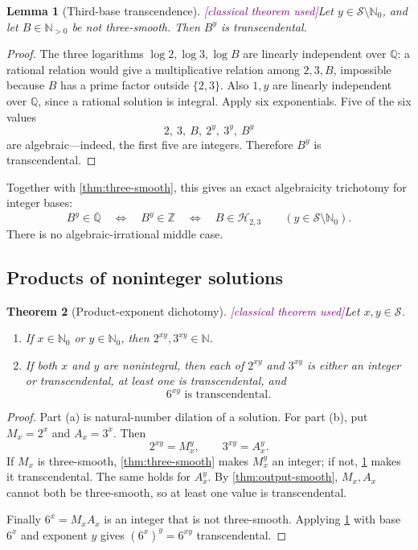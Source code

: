 \documentclass[11pt,oneside]{article}
\newtheorem{theorem}{Theorem}[section]
\newtheorem{lemma}[theorem]{Lemma}
\theoremstyle{definition}
\newcommand{\N}{\mathbb N}
\newcommand{\Nzero}{\mathbb N_0}
\newcommand{\Z}{\mathbb Z}
\newcommand{\Q}{\mathbb Q}
\newcommand{\Qbar}{\overline{\mathbb Q}}
\newcommand{\Sol}{\mathcal S}
\newcommand{\Smooth}{\mathcal H_{2,3}}
\newcommand{\tagClassical}{\textcolor{Purple}{\textsf{[classical theorem used]}}}
\begin{document}
\begin{lemma}[Third-base transcendence]\label{lem:third-base-trans}
\tagClassical Let \(y\in\Sol\setminus\Nzero\), and let \(B\in\N_{>0}\) be not
three-smooth.  Then \(B^y\) is transcendental.
\end{lemma}

\begin{proof}
The three logarithms \(\log2,\log3,\log B\) are linearly independent over \(\Q\): a
rational relation would give a multiplicative relation among \(2,3,B\), impossible because
\(B\) has a prime factor outside \(\{2,3\}\).  Also \(1,y\) are linearly independent
over \(\Q\), since a rational solution is integral.  Apply six exponentials.  Five of the
six values
\[
  2,\ 3,\ B,\ 2^y,\ 3^y,\ B^y
\]
are algebraic---indeed, the first five are integers.  Therefore \(B^y\) is
transcendental.
\end{proof}

Together with \cref{thm:three-smooth}, this gives an exact algebraicity trichotomy for
integer bases:
\[
  B^y\in\Qbar
  \quad\Longleftrightarrow\quad
  B^y\in\Z
  \quad\Longleftrightarrow\quad
  B\in\Smooth
  \qquad(y\in\Sol\setminus\Nzero).
\]
There is no algebraic-irrational middle case.

\subsection{Products of noninteger solutions}

\begin{theorem}[Product-exponent dichotomy]\label{thm:product-trans}
\tagClassical Let \(x,y\in\Sol\).
\begin{enumerate}[label=\textup{(\alph*)}]
\item If \(x\in\Nzero\) or \(y\in\Nzero\), then \(2^{xy},3^{xy}\in\N\).
\item If both \(x\) and \(y\) are nonintegral, then each of \(2^{xy}\) and
\(3^{xy}\) is either an integer or transcendental, at least one is transcendental, and
\[
  \boxed{\quad 6^{xy}\text{ is transcendental}.\quad}
\]
\end{enumerate}
\end{theorem}

\begin{proof}
Part (a) is natural-number dilation of a solution.  For part (b), put
\(M_x=2^x\) and \(A_x=3^x\).  Then
\[
  2^{xy}=M_x^y,
  \qquad
  3^{xy}=A_x^y.
\]
If \(M_x\) is three-smooth, \cref{thm:three-smooth} makes \(M_x^y\) an integer; if not,
\cref{lem:third-base-trans} makes it transcendental.  The same holds for \(A_x^y\).
By \cref{thm:output-smooth}, \(M_x,A_x\) cannot both be three-smooth, so at least one
value is transcendental.

Finally \(6^x=M_xA_x\) is an integer that is not three-smooth.  Applying
\cref{lem:third-base-trans} with base \(6^x\) and exponent \(y\) gives
\((6^x)^y=6^{xy}\) transcendental.
\end{proof}
\end{document}
